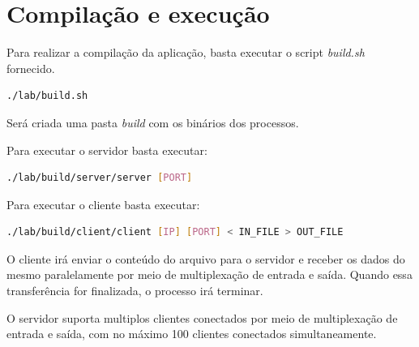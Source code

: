 \documentclass[12pt,a4paper]{report}
\begin{document}
\section{Compilação e execução}

Para realizar a compilação da aplicação, basta executar o script \emph{build.sh} fornecido.

\begin{lstlisting}[language=bash]
    ./lab/build.sh
\end{lstlisting}

Será criada uma pasta \emph{build} com os binários dos processos.

Para executar o servidor basta executar:

\begin{lstlisting}[language=bash]
    ./lab/build/server/server [PORT]
\end{lstlisting}

Para executar o cliente basta executar:
\begin{lstlisting}[language=bash]
    ./lab/build/client/client [IP] [PORT] < IN_FILE > OUT_FILE
\end{lstlisting}

O cliente irá enviar o conteúdo do arquivo para o servidor e receber os dados do mesmo paralelamente por meio de multiplexação de entrada e saída. Quando essa transferência for finalizada, o processo irá terminar.

O servidor suporta multiplos clientes conectados por meio de multiplexação de entrada e saída, com no máximo 100 clientes conectados simultaneamente.
\end{document}
